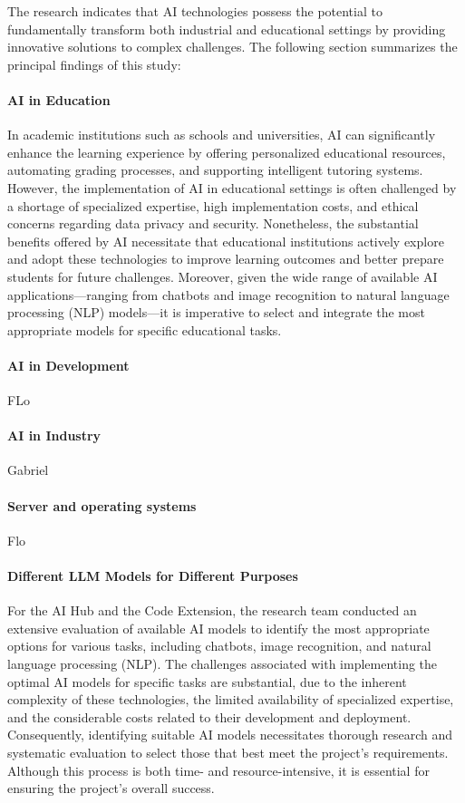 The research indicates that AI technologies possess the potential to fundamentally transform both industrial and educational settings by providing innovative solutions 
to complex challenges. The following section summarizes the principal findings of this study:

\paragraph{AI in Education}

In academic institutions such as schools and universities, AI can significantly enhance the learning experience by offering personalized educational resources, 
automating grading processes, and supporting intelligent tutoring systems. However, the implementation of AI in educational settings is often challenged by a shortage of 
specialized expertise, high implementation costs, and ethical concerns regarding data privacy and security. Nonetheless, 
the substantial benefits offered by AI necessitate that educational institutions actively explore and adopt these technologies 
to improve learning outcomes and better prepare students for future challenges. Moreover, given the wide range of available AI applications—ranging from chatbots and image 
recognition to natural language processing (NLP) models—it is imperative to select and integrate the most appropriate models for specific educational tasks.

\paragraph{AI in Development}

FLo

\paragraph{AI in Industry}

Gabriel

\paragraph{Server and operating systems}

Flo
\paragraph{Different LLM Models for Different Purposes}

For the AI Hub and the Code Extension, the research team conducted an extensive evaluation of available AI models to identify the most appropriate options for various tasks, including chatbots, image recognition, and natural language processing (NLP). The challenges associated with implementing the optimal AI models for specific tasks are substantial, due to the inherent complexity of these technologies, the limited availability of specialized expertise, and the considerable costs related to their development and deployment. Consequently, identifying suitable AI models necessitates thorough research and systematic evaluation to select those that best meet the project’s requirements. Although this process is both time- and resource-intensive, it is essential for ensuring the project’s overall success.

